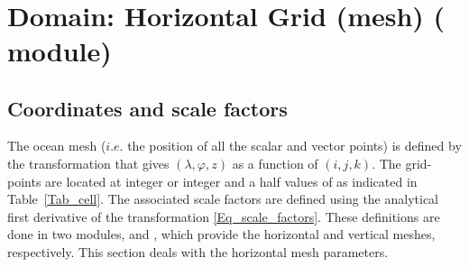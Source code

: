 $\ $\newline    %

\section  [Domain: Horizontal Grid (mesh) (\textit{domhgr})]               
		{Domain: Horizontal Grid (mesh) \small{( module)} }
\label{DOM_hgr}

\subsection{Coordinates and scale factors}
\label{DOM_hgr_coord_e}

The ocean mesh ($i.e.$ the position of all the scalar and vector points) is defined 
by the transformation that gives $(\lambda,\varphi,z)$ as a function of $(i,j,k)$. 
The grid-points are located at integer or integer and a half values of as indicated 
in Table~\ref{Tab_cell}. The associated scale factors are defined using the 
analytical first derivative of the transformation \eqref{Eq_scale_factors}. These 
definitions are done in two modules,  and , which 
provide the horizontal and vertical meshes, respectively. This section deals with 
the horizontal mesh parameters.

